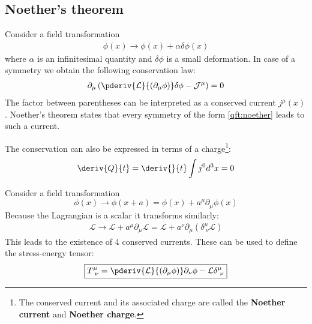 \subsection{Noether's theorem}

	\begin{theorem}\label{qft:noethers_theorem}
		Consider a field transformation
		\begin{gather}
			\label{qft:noether}
			\phi(x)\rightarrow \phi(x) + \alpha\delta\phi(x)
		\end{gather}
		where $\alpha$ is an infinitesimal quantity and $\delta\phi$ is a small deformation. In case of a symmetry we obtain the following conservation law:
		 \begin{gather}
		 	\label{qft:conserved_current}
		 	\partial_\mu\left(\pderiv{\mathcal{L}}{(\partial_\mu\phi)}\delta\phi - \mathcal{J}^\mu\right) = 0
		 \end{gather}
		 The factor between parentheses can be interpreted as a conserved current $j^\mu(x)$. Noether's theorem states that every symmetry of the form \ref{qft:noether} leads to such a current.
		 
		 The conservation can also be expressed in terms of a charge\footnote{The conserved current and its associated charge are called the \textbf{Noether current} and \textbf{Noether charge}.}:
		 \begin{gather}
		 	\deriv{Q}{t} = \deriv{}{t}\int j^0d^3x = 0
		 \end{gather}
	\end{theorem}

	\begin{definition}
		Consider a field transformation
		\[
			\phi(x)\rightarrow\phi(x+a) = \phi(x) + a^\mu\partial_\mu\phi(x)
		\]
		Because the Lagrangian is a scalar it transforms similarly:
		\begin{gather}
			\mathcal{L}\rightarrow\mathcal{L} + a^\mu\partial_\mu\mathcal{L} = \mathcal{L} + a^\nu\partial_\mu(\delta^\mu_{\ \nu}\mathcal{L})
		\end{gather}
		This leads to the existence of 4 conserved currents. These can be used to define the stress-energy tensor:
		\begin{gather}
			\label{relativity:stress_energy_tensor}
			\boxed{T^\mu_{\ \nu} = \pderiv{\mathcal{L}}{(\partial_\mu\phi)}\partial_\nu\phi - \mathcal{L}\delta^\mu_{\ \nu}}
		\end{gather}
	\end{definition}


